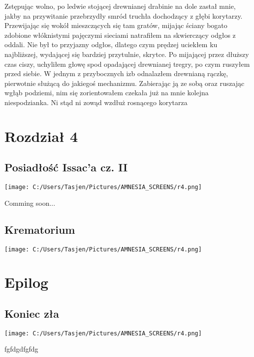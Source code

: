 \documentclass[12pt,a4paper]{report}
\begin{document}
Zstępując wolno, po ledwie stojącej drewnianej drabinie na dole zastał mnie, jakby na przywitanie przebrzydły smród truchła dochodzący z głębi korytarzy. Przewijając się wokół mieszczących się tam gratów, mijając ściany bogato zdobione włóknistymi pajęczymi sieciami natrafiłem na skwierczący odgłos z oddali. Nie był to przyjazny odgłos, dlatego czym prędzej uciekłem ku najbliższej, wydającej się bardziej przytulnie, skrytce. Po mijającej przez dłuższy czas ciszy, uchyliłem głowę spod opadającej drewnianej tregry, po czym ruszyłem przed siebie. W jednym z przybocznych izb odnalazłem drewnianą rączkę, pierwotnie służącą do jakiegoś mechanizmu. Zabierając ją ze sobą oraz ruszając wgłąb podziemi, nim się zorientowałem czekała już na mnie kolejna niespodzianka. Ni stąd ni zowąd wzdłuż rosnącego korytarza  
 
\section{\textbf{Rozdział 4}}
\subsection{Posiadłość Issac'a cz. II}
\begin{center}
\texttt{[image: C:/Users/Tasjen/Pictures/AMNESIA\_SCREENS/r4.png]} \\
\end{center}

Comming soon...
 
\subsection{Krematorium}
\begin{center}
\texttt{[image: C:/Users/Tasjen/Pictures/AMNESIA\_SCREENS/r4.png]} \\
\end{center}
 
\section{\textbf{Epilog}} 
\subsection{Koniec zła}
\begin{center}
\texttt{[image: C:/Users/Tasjen/Pictures/AMNESIA\_SCREENS/r4.png]} \\
\end{center}
 
fgfdgdfgfdg
\end{document}
